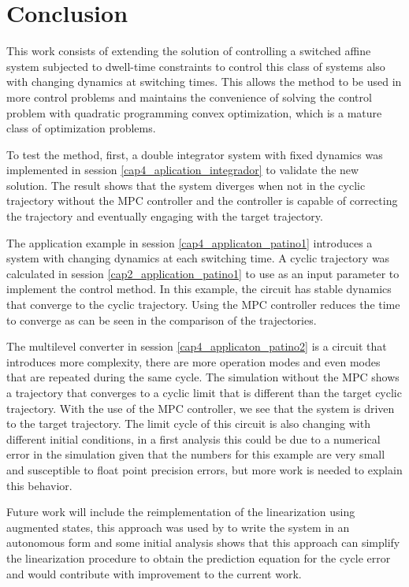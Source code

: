 \chapter{Conclusion}

This work consists of extending the solution of controlling a switched affine system 
subjected to dwell-time constraints to control this class of systems also with changing 
dynamics at switching times. This allows the method to be used in more control problems 
and maintains the convenience of solving the control problem with quadratic programming 
convex optimization, which is a mature class of optimization problems.

To test the method, first, a double integrator system with fixed dynamics was implemented in session \ref{cap4_aplication_integrador}
to validate the new solution. The result shows that the system diverges when not in the cyclic trajectory without the MPC controller and 
the controller is capable of correcting the trajectory and eventually engaging with the target trajectory.

The application example in session \ref{cap4_applicaton_patino1} introduces a system with changing dynamics at each switching time. 
A cyclic trajectory was calculated in session \ref{cap2_application_patino1} to use as an input parameter to implement the control method.
In this example, the circuit has stable dynamics that converge to the cyclic trajectory. Using the MPC controller reduces the time to converge
as can be seen in the comparison of the trajectories.

The multilevel converter in session \ref{cap4_applicaton_patino2} is a circuit that 
introduces more complexity, there are more operation modes and even modes that are repeated
during the same cycle. The simulation without the MPC shows a trajectory that converges to a cyclic limit 
that is different than the target cyclic trajectory. With the use of the MPC controller, we see that the system 
is driven to the target trajectory. The limit cycle of this circuit is also changing with different initial conditions,
in a first analysis this could be due to a numerical error in the simulation given that the numbers for this example 
are very small and susceptible to float point precision errors, but more work is needed to explain this behavior.

Future work will include the reimplementation of the linearization using augmented states, 
this approach was used by  to write the system in an 
autonomous form and some initial analysis shows that this approach can simplify the 
linearization procedure to obtain the prediction equation for the cycle error and would 
contribute with improvement to the current work.

